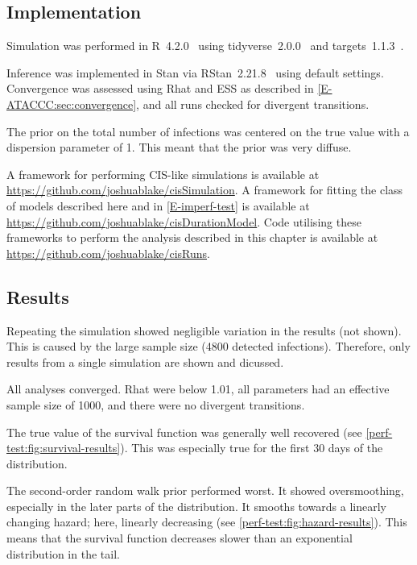 \documentclass[thesis.tex]{subfiles}
\begin{document}
\subsection{Implementation}

Simulation was performed in R~4.2.0~\autocite{R4-2-0} using tidyverse~2.0.0~\autocite{tidyverse} and targets~1.1.3~\autocite{targetsPackage}.

Inference was implemented in Stan via RStan~2.21.8~\autocite{rstan2-21-8} using default settings.
Convergence was assessed using Rhat and ESS as described in \cref{E-ATACCC:sec:convergence}, and all runs checked for divergent transitions.

The prior on the total number of infections was centered on the true value with a dispersion parameter of 1.
This meant that the prior was very diffuse.

A framework for performing CIS-like simulations is available at \url{https://github.com/joshuablake/cisSimulation}.
A framework for fitting the class of models described here and in \cref{E-imperf-test} is available at \url{https://github.com/joshuablake/cisDurationModel}.
Code utilising these frameworks to perform the analysis described in this chapter is available at \url{https://github.com/joshuablake/cisRuns}.

\subsection{Results}

Repeating the simulation showed negligible variation in the results (not shown).
This is caused by the large sample size (4800 detected infections).
Therefore, only results from a single simulation are shown and dicussed.

All analyses converged.
Rhat were below 1.01, all parameters had an effective sample size of 1000, and there were no divergent transitions.

The true value of the survival function was generally well recovered (see \cref{perf-test:fig:survival-results}).
This was especially true for the first 30 days of the distribution.

The second-order random walk prior performed worst.
It showed oversmoothing, especially in the later parts of the distribution.
It smooths towards a linearly changing hazard; here, linearly decreasing (see \cref{perf-test:fig:hazard-results}).
This means that the survival function decreases slower than an exponential distribution in the tail.
\end{document}
